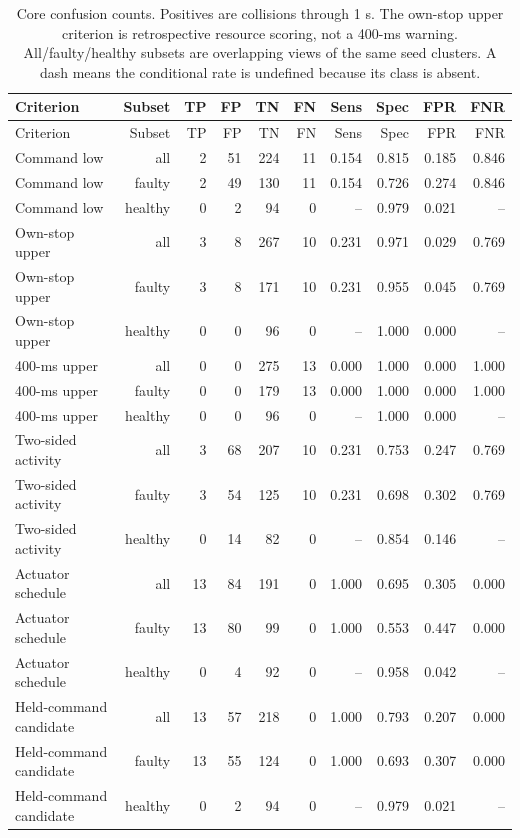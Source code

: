 \documentclass[10pt,letterpaper]{article}
\begin{document}
{\small
\begin{longtable}{lrrrrrrrrr}
\caption{Core confusion counts. Positives are collisions through 1 s. The own-stop upper criterion is retrospective resource scoring, not a 400-ms warning. All/faulty/healthy subsets are overlapping views of the same seed clusters. A dash means the conditional rate is undefined because its class is absent.}\\
\toprule
Criterion & Subset & TP & FP & TN & FN & Sens & Spec & FPR & FNR\\
\midrule\endfirsthead
\toprule
Criterion & Subset & TP & FP & TN & FN & Sens & Spec & FPR & FNR\\
\midrule\endhead
Command low & all & 2 & 51 & 224 & 11 & 0.154 & 0.815 & 0.185 & 0.846\\
Command low & faulty & 2 & 49 & 130 & 11 & 0.154 & 0.726 & 0.274 & 0.846\\
Command low & healthy & 0 & 2 & 94 & 0 & -- & 0.979 & 0.021 & --\\
Own-stop upper & all & 3 & 8 & 267 & 10 & 0.231 & 0.971 & 0.029 & 0.769\\
Own-stop upper & faulty & 3 & 8 & 171 & 10 & 0.231 & 0.955 & 0.045 & 0.769\\
Own-stop upper & healthy & 0 & 0 & 96 & 0 & -- & 1.000 & 0.000 & --\\
400-ms upper & all & 0 & 0 & 275 & 13 & 0.000 & 1.000 & 0.000 & 1.000\\
400-ms upper & faulty & 0 & 0 & 179 & 13 & 0.000 & 1.000 & 0.000 & 1.000\\
400-ms upper & healthy & 0 & 0 & 96 & 0 & -- & 1.000 & 0.000 & --\\
Two-sided activity & all & 3 & 68 & 207 & 10 & 0.231 & 0.753 & 0.247 & 0.769\\
Two-sided activity & faulty & 3 & 54 & 125 & 10 & 0.231 & 0.698 & 0.302 & 0.769\\
Two-sided activity & healthy & 0 & 14 & 82 & 0 & -- & 0.854 & 0.146 & --\\
Actuator schedule & all & 13 & 84 & 191 & 0 & 1.000 & 0.695 & 0.305 & 0.000\\
Actuator schedule & faulty & 13 & 80 & 99 & 0 & 1.000 & 0.553 & 0.447 & 0.000\\
Actuator schedule & healthy & 0 & 4 & 92 & 0 & -- & 0.958 & 0.042 & --\\
Held-command candidate & all & 13 & 57 & 218 & 0 & 1.000 & 0.793 & 0.207 & 0.000\\
Held-command candidate & faulty & 13 & 55 & 124 & 0 & 1.000 & 0.693 & 0.307 & 0.000\\
Held-command candidate & healthy & 0 & 2 & 94 & 0 & -- & 0.979 & 0.021 & --\\
\bottomrule
\end{longtable}
}
\end{document}
